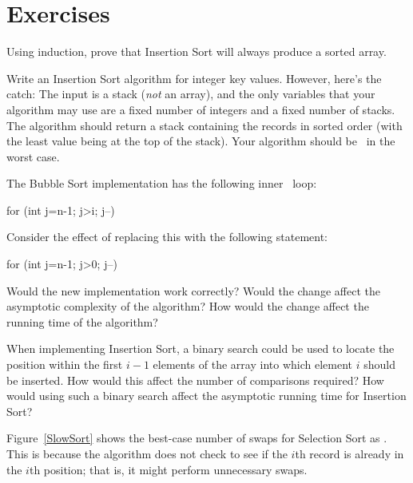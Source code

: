 \section{Exercises}

\begin{exercises}

\item
Using induction, prove that Insertion Sort will
always produce a sorted array.

\item
Write an Insertion Sort
algorithm for integer key values.
However, here's the catch:
The input is a stack (\emph{not} an array), and the only
variables that your algorithm may use are a fixed number of integers
and a fixed number of stacks.
The algorithm should return a stack containing the records in sorted
order (with the least value being at the top of the stack).
Your algorithm should be \Thetantwo\ in the worst case.

\item
The Bubble Sort
implementation has the following inner \Cfor\ loop:

\begin{progenvexer}
for (int j=n-1; j>i; j--)
\end{progenvexer}

\noindent
Consider the effect of replacing this with the following statement:

\begin{progenvexer}
for (int j=n-1; j>0; j--)
\end{progenvexer}

\noindent Would the new implementation work correctly?
Would the change affect the asymptotic complexity of the algorithm?
How would the change affect the running time of the algorithm?

\item
When implementing Insertion Sort,
a binary search could be used to
locate the position within the first \(i-1\) elements of the array
into which element \(i\) should be inserted.
How would this affect the number of comparisons required?
How would using such a binary search affect the asymptotic
running time for Insertion Sort?

\item
Figure~\ref{SlowSort} shows the best-case number of swaps for
Selection Sort as \Thetan.
This is because the algorithm does not check to see if the \(i\)th
record is already in the \(i\)th position; that is, it might perform
unnecessary swaps.


\end{exercises}
